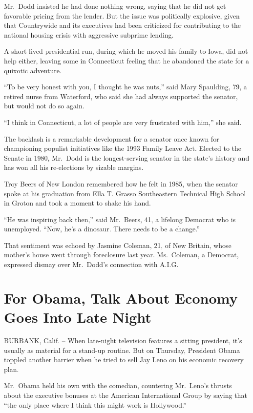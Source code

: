 \documentclass[12pt,a4paper,onecolumn]{article}
\begin{document}
\begin{CJK*}{GBK}{song}
Mr.~Dodd insisted he had done nothing wrong, saying that he did not get favorable pricing from the
lender. But the issue was politically explosive, given that Countrywide and its executives had been
criticized for contributing to the national housing crisis with aggressive subprime lending.

A short-lived presidential run, during which he moved his family to Iowa, did not help either,
leaving some in Connecticut feeling that he abandoned the state for a quixotic adventure.

``To be very honest with you, I thought he was nuts,'' said Mary Spaulding, 79, a retired nurse from
Waterford, who said she had always supported the senator, but would not do so again.

``I think in Connecticut, a lot of people are very frustrated with him,'' she said.

The backlash is a remarkable development for a senator once known for championing populist
initiatives like the 1993 Family Leave Act. Elected to the Senate in 1980, Mr.~Dodd is the
longest-serving senator in the state's history and has won all his re-elections by sizable margins.

Troy Beers of New London remembered how he felt in 1985, when the senator spoke at his graduation
from Ella T. Grasso Southeastern Technical High School in Groton and took a moment to shake his
hand.

``He was inspiring back then,'' said Mr.~Beers, 41, a lifelong Democrat who is unemployed. ``Now,
he's a dinosaur. There needs to be a change.''

That sentiment was echoed by Jasmine Coleman, 21, of New Britain, whose mother's house went through
foreclosure last year. Ms.~Coleman, a Democrat, expressed dismay over Mr.~Dodd's connection with A.I.G.

\section{For Obama, Talk About Economy Goes Into Late Night}

BURBANK, Calif. -- When late-night television features a sitting president, it's usually as material
for a stand-up routine. But on Thursday, President Obama toppled another barrier when he tried to
sell Jay Leno on his economic recovery plan.

Mr.~Obama held his own with the comedian, countering Mr.~Leno's thrusts about the executive bonuses
at the American International Group by saying that ``the only place where I think this might work is
Hollywood.''


\end{CJK*}
\end{document}
